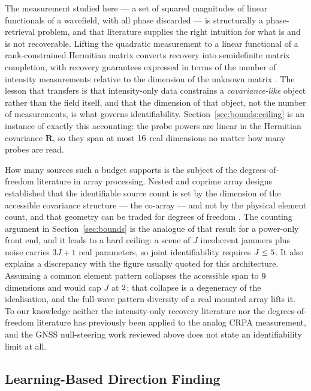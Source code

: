\documentclass[journal]{IEEEtran}
\newcommand{\Rt}{\mathbf{R}}
\begin{document}
The measurement studied here --- a set of squared magnitudes of linear
functionals of a wavefield, with all phase discarded --- is structurally a
phase-retrieval problem, and that literature supplies the right intuition for
what is and is not recoverable. Lifting the quadratic measurement to a linear
functional of a rank-constrained Hermitian matrix converts recovery into
semidefinite matrix completion, with recovery guarantees expressed in terms of
the number of intensity measurements relative to the dimension of the unknown
matrix \cite{candes2013, jaganathan2016}. The lesson that transfers is that
intensity-only data constrains a \emph{covariance-like} object rather than the
field itself, and that the dimension of that object, not the number of
measurements, is what governs identifiability. Section~\ref{sec:bounds:ceiling}
is an instance of exactly this accounting: the probe powers are linear in the
Hermitian covariance $\Rt$, so they span at most $16$ real dimensions no
matter how many probes are read.

How many sources such a budget supports is the subject of the
degrees-of-freedom literature in array processing. Nested and coprime array
designs established that the identifiable source count is set by the dimension
of the accessible covariance structure --- the co-array --- and not by the
physical element count, and that geometry can be traded for degrees of freedom
\cite{pal2010, vaidyanathan2011}. The counting argument in
Section~\ref{sec:bounds} is the analogue of that result for a power-only
front end, and it leads to a hard ceiling: a scene of $J$ incoherent jammers
plus noise carries $3J+1$ real parameters, so joint identifiability requires
$J \le 5$. It also explains a discrepancy with the figure usually quoted
for this architecture. Assuming a common element pattern collapses the
accessible span to $9$ dimensions and would cap $J$ at
$2$; that collapse is a degeneracy of the idealisation, and the
full-wave pattern diversity of a real mounted array lifts it. To our knowledge
neither the intensity-only recovery literature nor the degrees-of-freedom
literature has previously been applied to the analog CRPA measurement, and the
GNSS null-steering work reviewed above does not state an identifiability limit
at all.

\subsection{Learning-Based Direction Finding}
\label{sec:lit:learning}
\end{document}
